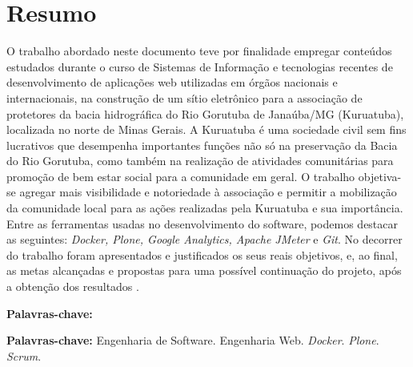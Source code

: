 \chapter*{Resumo}

\vspace{0.4cm}

\noindent O trabalho abordado neste documento teve por finalidade empregar conteúdos estudados durante o curso de Sistemas de Informação e tecnologias recentes de desenvolvimento de aplicações web utilizadas em órgãos nacionais e internacionais, na construção de um sítio eletrônico para a associação de protetores da bacia hidrográfica do Rio Gorutuba de Janaúba/MG (Kuruatuba), localizada no norte de Minas Gerais. A Kuruatuba é uma sociedade civil sem fins lucrativos que desempenha importantes funções não só na preservação da Bacia do Rio Gorutuba, como também na realização de atividades comunitárias para promoção de bem estar social para a comunidade em geral. O trabalho objetiva-se agregar mais visibilidade e notoriedade à associação e permitir a mobilização da comunidade local para as ações realizadas pela Kuruatuba e sua importância.   
Entre as ferramentas usadas no desenvolvimento do software, podemos destacar as seguintes: \textit{Docker, Plone, Google Analytics, Apache JMeter} e \textit{Git}.  
No decorrer do trabalho foram apresentados e justificados os seus reais objetivos, e, ao final, as metas alcançadas e propostas para uma possível continuação do projeto, após a obtenção dos resultados .

\begin{labeling}{\textbf{Palavras-chave:}}
\item[\textbf{Palavras-chave:}] 
Engenharia de Software.
Engenharia Web.
\textit{Docker}.
\textit{Plone}.
\textit{Scrum}.
\end{labeling}

